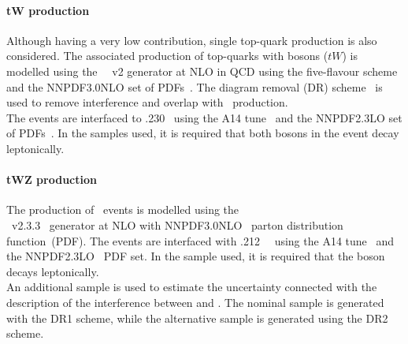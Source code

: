\paragraph{tW production} 
Although having a very low contribution, single top-quark production is also considered.
The associated production of top-quarks with \PW bosons ($tW$) is
modelled using the
\powhegbox~\cite{Re:2010bp,Nason:2004rx,Frixione:2007vw,Alioli:2010xd}~v2
generator at NLO in QCD using the five-flavour scheme and the
\textsc{NNPDF3.0NLO} set of PDFs~\cite{Ball:2014uwa}.
The diagram removal (DR) scheme~\cite{Frixione:2008yi} is used to
remove interference and overlap with \ttbar\ production.\\ 
The events are interfaced to \pythia.230~\cite{Sjostrand:2014zea} using the A14
tune~\cite{ATL-PHYS-PUB-2014-021} and the \textsc{NNPDF2.3LO} set of
PDFs~\cite{Ball:2012cx}.
In the samples used, it is required that both \PW bosons in the event decay leptonically. 

\paragraph{tWZ production} 
The production of \tWZ\ events is modelled using the \\ \mgamc~v2.3.3~\cite{Alwall:2014hca}
generator at NLO with \textsc{NNPDF3.0NLO}~\cite{Ball:2014uwa} parton distribution function~(PDF).
The events are interfaced with \pythia.212~\cite{Sjostrand:2014zea}~ using the A14 tune~\cite{ATL-PHYS-PUB-2014-021} and the \textsc{NNPDF2.3LO}~\cite{Ball:2014uwa} PDF set.
In the sample used, it is required that the \PZ boson decays leptonically. \\
An additional \tWZ sample is used to estimate the uncertainty connected with the description of the interference between \ttZ and \tWZ. The nominal sample is generated with the DR1 scheme, while the alternative sample is generated using the DR2 scheme.

